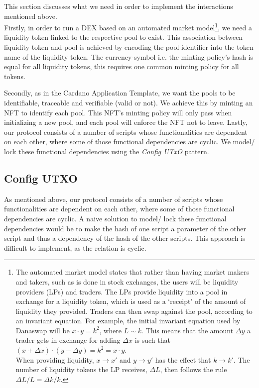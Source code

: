 \documentclass{article}
\begin{document}
This section discusses what we need in order to implement the interactions
mentioned above. \\

Firstly, in order to run a DEX based on an automated market model\footnote{
  The automated market model states that rather than having market makers and
  takers, such as is done in stock exchanges, the users will be liquidity
  providers (LPs) and traders. The LPs provide liquidity into a pool in exchange
  for a liquidity token, which is used as a `receipt' of the amount of liquidity
  they provided. Traders can then swap against the pool, according to an
  invariant equation. For example, the initial invariant equation used by
  Danaswap will be $x \cdot y = k^2$, where $L \sim k$. This means that the
  amount $\Delta y$ a trader gets in exchange for adding $\Delta x$ is such that
  $(x + \Delta x) \cdot (y - \Delta y) = k^2 = x \cdot y$. \\

  When providing liquidity, $x \rightarrow x'$ and $y \rightarrow y'$ has the
  effect that $k \rightarrow k'$. The number of liquidity tokens the LP
  receives, $\Delta L$, then follows the rule $\Delta L / L = \Delta k / k$.
}, we need a liquidity token linked to the respective pool to exist. This association between liquidity token and pool is achieved by encoding the pool identifier into the token name of the liquidity token. The currency-symbol i.e. the minting policy's hash is equal for all liquidity tokens, this requires one common minting policy for all tokens.

Secondly, as in the Cardano Application Template, we want the pools to be
identifiable, traceable and verifiable (valid or not).
We achieve this by minting an NFT to identify each pool.
This NFT's minting policy will only pass when initializing a new pool, and each pool will enforce the NFT not to leave.
Lastly, our protocol consists of a number of scripts whose functionalities are dependent
on each other, where some of those functional dependencies are cyclic. We model/ lock these
functional dependencies using the \textit{Config UTxO} pattern.

\subsection{Config UTXO}

As mentioned above, our protocol consists of a number of scripts whose functionalities are dependent on each other,
where some of those functional dependencies are cyclic.
A naive solution to model/ lock these functional dependencies would be to
make the hash of one script a parameter of the other script and thus a dependency of the hash of the other scripts.
This approach is difficult to implement, as the relation is cyclic. \\
\end{document}
